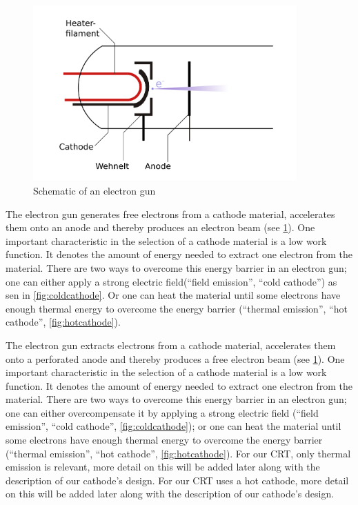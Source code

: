 \begin{figure}
	\centering
	\includegraphics[width=0.9\textwidth]{Chapters/CRT-Basics/electron_gun}
	\caption{Schematic of an electron gun}
	\label{fig:electrongun}
\end{figure}

The electron gun generates free electrons from a cathode material, accelerates them onto an anode and thereby produces an electron beam (see \cref{fig:electrongun}). One important characteristic in the selection of a cathode material is a low work function. It denotes the amount of energy needed to extract one electron from the material. There are two ways to overcome this energy barrier in an electron gun; one can either apply a strong electric field(``field emission'', ``cold cathode'')  as sen in \cref{fig:coldcathode}.  Or one can heat the material until some electrons have enough thermal energy to overcome the energy barrier (``thermal emission'', ``hot cathode'', \cref{fig:hotcathode}).

The electron gun extracts electrons from a cathode material, accelerates them onto a perforated anode and thereby produces a free electron beam (see \cref{fig:electrongun}). One important characteristic in the selection of a cathode material is a low work function. It denotes the amount of energy needed to extract one electron from the material. There are two ways to overcome this energy barrier in an electron gun; one can either overcompensate it by applying a strong electric field (``field emission'', ``cold cathode'', \cref{fig:coldcathode}); or one can heat the material until some electrons have enough thermal energy to overcome the energy barrier (``thermal emission'', ``hot cathode'', \cref{fig:hotcathode}). For our CRT, only thermal emission is relevant, more detail on this will be added later along with the description of our cathode's design. 
For our CRT uses a hot cathode, more detail on this will be added later along with the description of our cathode's design. 

